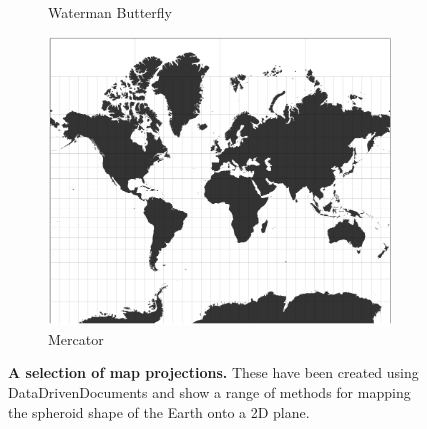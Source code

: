 \begin{figure}[H]
\begin{subfigure}[b]{.3\textwidth}
     \caption{Waterman Butterfly}
     \end{subfigure}
     \begin{subfigure}[b]{.3\textwidth}
         \centering
     \includegraphics[width=\textwidth]{figures_c1/layout/mercator.png}
     \caption{Mercator}
     \end{subfigure}
        \caption{\textbf{A selection of map projections.} These have been created using DataDrivenDocuments \citep{d3} and show a range of methods for mapping the spheroid shape of the Earth onto a 2D plane. }
      \label{fig:projections}
\end{figure}



